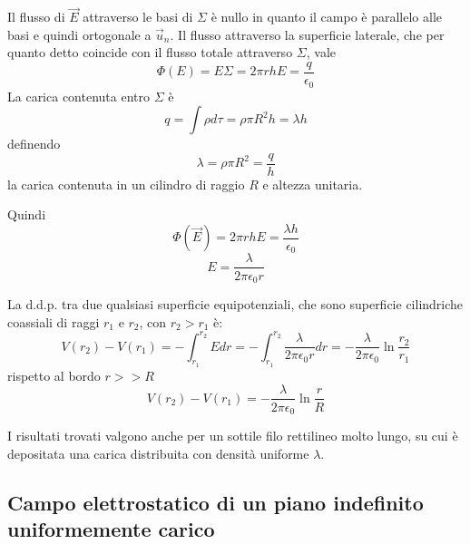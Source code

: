 \documentclass[class=book, crop=false, oneside, 12pt]{standalone}
\begin{document}
Il flusso di \(\overrightarrow{E}\) attraverso le basi di \(\Sigma\) è nullo in quanto il campo è parallelo alle basi e quindi ortogonale a \(\overrightarrow{u}_n\). 
Il flusso attraverso la superficie laterale, che per quanto detto coincide con il flusso totale attraverso \(\Sigma\), vale
\begin{equation*}
    \Phi(E) = E \Sigma = 2 \pi r h E = \frac{q}{\epsilon_0}
\end{equation*} 
La carica contenuta entro \(\Sigma\) è 
\begin{equation*}
    q = \int \rho d \tau = \rho \pi R^2 h = \lambda h
\end{equation*}
definendo
\begin{equation*}
    \lambda = \rho \pi R^2 = \frac{q}{h}
\end{equation*}
la carica contenuta in un cilindro di raggio \(R\) e altezza unitaria.

Quindi
\begin{equation*}
    \Phi(\overrightarrow{E}) = 2 \pi r h E = \frac{\lambda h}{\epsilon_0} 
\end{equation*}
\begin{equation*}
    E = \frac{\lambda}{2 \pi \epsilon_0 r}
\end{equation*}

La d.d.p. tra due qualsiasi superficie equipotenziali, che sono superficie cilindriche coassiali di raggi \(r_1\) e \(r_2\), con \(r_2 > r_1\) è: 
\begin{equation*}
    V(r_2) - V(r_1) = - \int_{r_1}^{r_2} E d r = - \int_{r_1}^{r_2} \frac{\lambda}{2 \pi \epsilon_0 r} d r = - \frac{\lambda}{2 \pi \epsilon_0} \ln \frac{r_2}{r_1}
\end{equation*}
rispetto al bordo \(r >> R\)
\begin{equation*}
    V(r_2) - V(r_1) = - \frac{\lambda}{2 \pi \epsilon_0} \ln \frac{r}{R}
\end{equation*}

I risultati trovati valgono anche per un sottile filo rettilineo molto lungo, su cui è depositata una carica distribuita con densità uniforme \(\lambda\).

\subsection{Campo elettrostatico di un piano indefinito uniformemente carico}
\end{document}

